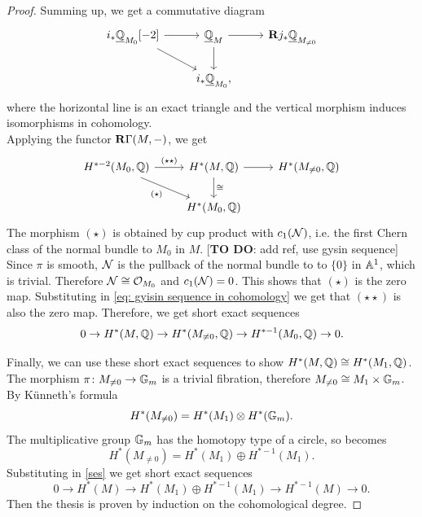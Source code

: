 \begin{proof}
Summing up, we get a commutative diagram
\[\begin{tikzcd} \label{eq: Gysin sequence 2}
	{i_* \underline{\Qb}_{M_0}[-2] } & {\underline{\Qb}_M} & {\R j_* \underline{\Qb}_{M_{\neq 0}}} \\
	& {i_* \underline{\Qb}_{M_0},}
	\arrow[from=1-1, to=1-2]
	\arrow[from=1-1, to=2-2]
	\arrow[from=1-2, to=1-3]
	\arrow[from=1-2, to=2-2]
\end{tikzcd}\]
where the horizontal line is an exact triangle and the vertical morphism induces isomorphisms in cohomology.\\
Applying the functor $\mathbf{R} \Gamma(M, -)$, we get
\begin{equation} \label{eq: gyisin sequence in cohomology}
\begin{tikzcd}
	{H^{*-2}(M_0, \Qb)} & {H^*(M, \Qb)} & {H^*(M_{\neq 0}, \Qb)} \\
	& {H^*(M_0, \Qb)}
	\arrow["(\star \star)", from=1-1, to=1-2]
	\arrow["(\star)"', from=1-1, to=2-2]
	\arrow[from=1-2, to=1-3]
	\arrow["\cong", from=1-2, to=2-2]
\end{tikzcd}
\end{equation}
The morphism $(\star)$ is obtained by cup product with $c_1(\mathcal{N})$, i.e. the first Chern class of the normal bundle to $M_0$ in $M$. [\textbf{TO DO}: add ref, use gysin sequence]\\
Since $\pi$ is smooth, $\mathcal{N}$ is the pullback of the normal bundle to to $\{0\}$ in $\mathbb{A}^1$, which is trivial.
Therefore $\mathcal{N} \cong \mathcal{O}_{M_0}$ and $c_1(\mathcal{N}) = 0$. This shows that $(\star)$ is the zero map. Substituting in \eqref{eq: gyisin sequence in cohomology} we get that $(\star \star)$ is also the zero map. Therefore, we get short exact sequences
\begin{equation} \label{ses}
0 \to H^*(M, \mathbb{Q}) \to H^*(M_{\neq 0}, \mathbb{Q}) \to H^{*-1}(M_0, \mathbb{Q}) \to 0.
\end{equation}

Finally, we can use these short exact sequences to show $H^*(M, \mathbb{Q}) \cong H^*(M_1, \mathbb{Q})$. The morphism $\pi\colon M_{\neq 0} \to \mathbb{G}_m$ is a trivial fibration, therefore $M_{\neq 0} \cong M_1 \times \mathbb{G}_m$. By K\"unneth's formula
    \begin{equation} \label{eq: cohomology of M_neq0}
    H^*(M_{\neq 0}) = H^*(M_1) \otimes H^*(\mathbb{G}_m).
    \end{equation}
    The multiplicative group $\mathbb{G}_m$ has the homotopy type of a circle, so  becomes
    \begin{equation}
    H^*(M_{\neq 0}) = H^*(M_1) \oplus H^{*-1}(M_1).
    \end{equation}
    Substituting in \eqref{ses} we get short exact sequences
    \begin{equation}
    0 \to H^*(M) \to H^*(M_1)\oplus H^{*-1}(M_1) \to H^{*-1}(M) \to 0.
    \end{equation}
    Then the thesis is proven by induction on the cohomological degree.
\end{proof}

